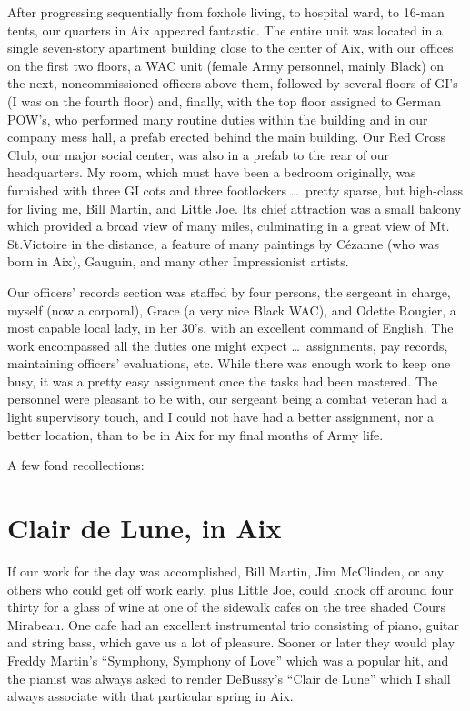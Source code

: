 \documentclass[../m3y]{subfiles}
\begin{document}
After progressing sequentially from foxhole living, to hospital ward, to 16-man tents, our quarters in Aix appeared fantastic. The entire unit was located in a single seven-story apartment building close to the center of Aix, with our offices on the first two floors, a WAC unit (female Army personnel, mainly Black) on the next, noncommissioned officers above them, followed by several floors of GI's (I was on the fourth floor) and, finally, with the top floor assigned to German POW's, who performed many routine duties within the building and in our company mess hall, a prefab erected behind the main building. Our Red Cross Club, our major social center, was also in a prefab to the rear of our headquarters. My room, which must have been a bedroom originally, was furnished with three GI cots and three footlockers \ldots\ pretty sparse, but high-class for living me, Bill Martin, and Little Joe. Its chief attraction was a small balcony which provided a broad view of many miles, culminating in a great view of Mt. St.\@ Victoire in the distance, a feature of many paintings by C\'ezanne (who was born in Aix), Gauguin, and many other Impressionist artists.

Our officers' records section was staffed by four persons, the sergeant in charge, myself (now a corporal), Grace (a very nice Black WAC), and Odette Rougier, a most capable local lady, in her 30's, with an excellent command of English. The work encompassed all the duties one might expect \ldots\ assignments, pay records, maintaining officers' evaluations, etc\@. While there was enough work to keep one busy, it was a pretty easy assignment once the tasks had been mastered. The personnel were pleasant to be with, our sergeant being a combat veteran had a light supervisory touch, and I could not have had a better assignment, nor a better location, than to be in Aix for my final months of Army life.

A few fond recollections:

\section{Clair de Lune, in Aix}
If our work for the day was accomplished, Bill Martin, Jim McClinden, or any others who could get off work early, plus Little Joe, could knock off around four thirty for a glass of wine at one of the sidewalk cafes on the tree shaded Cours Mirabeau. One cafe had an excellent instrumental trio consisting of piano, guitar and string bass, which gave us a lot of pleasure. Sooner or later they would play Freddy Martin's ``Symphony, Symphony of Love'' which was a popular hit, and the pianist was always asked to render DeBussy's ``Clair de Lune'' which I shall always associate with that particular spring in Aix.
\end{document}
